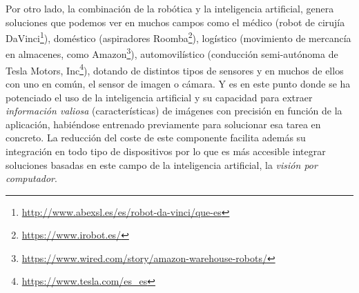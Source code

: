 Por otro lado, la combinación de la robótica y la inteligencia artificial, genera soluciones que podemos ver en muchos campos como el médico (robot de cirujía DaVinci\footnote{\url{http://www.abexsl.es/es/robot-da-vinci/que-es}}), doméstico (aspiradores Roomba\footnote{\url{https://www.irobot.es/}}), logístico (movimiento de mercancía en almacenes, como Amazon\footnote{\url{https://www.wired.com/story/amazon-warehouse-robots/}}), automovilístico (conducción semi-autónoma de Tesla Motors, Inc\footnote{\url{https://www.tesla.com/es_es}}), dotando de distintos tipos de sensores y en muchos de ellos con uno en común, el sensor de imagen o cámara. Y es en este punto donde se ha potenciado el uso de la inteligencia artificial y su capacidad para extraer \textit{información valiosa} (características) de imágenes con precisión en función de la aplicación, habiéndose entrenado previamente para solucionar esa tarea en concreto. La reducción del coste de este componente facilita además su integración en todo tipo de dispositivos por lo que es más accesible integrar soluciones basadas en este campo de la inteligencia artificial, la \textit{visión por computador}.\\

